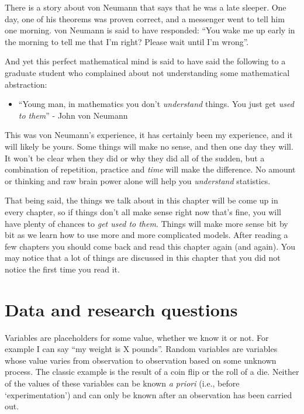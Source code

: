 \documentclass[
]{book}
\providecommand{\tightlist}{%
  \setlength{\itemsep}{0pt}\setlength{\parskip}{0pt}}
\begin{document}
There is a story about von Neumann that says that he was a late sleeper. One day, one of his theorems was proven correct, and a messenger went to tell him one morning. von Neumann is said to have responded: ``You wake me up early in the morning to tell me that I'm right? Please wait until I'm wrong''.

And yet this perfect mathematical mind is said to have said the following to a graduate student who complained about not understanding some mathematical abstraction:

\begin{itemize}
\tightlist
\item
  ``Young man, in mathematics you don't \emph{understand} things. You just get \emph{used to them}'' - John von Neumann
\end{itemize}

This was von Neumann's experience, it has certainly been my experience, and it will likely be yours. Some things will make no sense, and then one day they will. It won't be clear when they did or why they did all of the sudden, but a combination of repetition, practice and \emph{time} will make the difference. No amount or thinking and raw brain power alone will help you \emph{understand} statistics.

That being said, the things we talk about in this chapter will be come up in every chapter, so if things don't all make sense right now that's fine, you will have plenty of chances to \emph{get used to them}. Things will make more sense bit by bit as we learn how to use more and more complicated models. After reading a few chapters you should come back and read this chapter again (and again). You may notice that a lot of things are discussed in this chapter that you did not notice the first time you read it.

\hypertarget{data-and-research-questions}{%
\section{Data and research questions}\label{data-and-research-questions}}

Variables are placeholders for some value, whether we know it or not. For example I can say ``my weight is X pounds''. Random variables are variables whose value varies from observation to observation based on some unknown process. The classic example is the result of a coin flip or the roll of a die. Neither of the values of these variables can be known \emph{a priori} (i.e., before `experimentation') and can only be known after an observation has been carried out.
\end{document}
